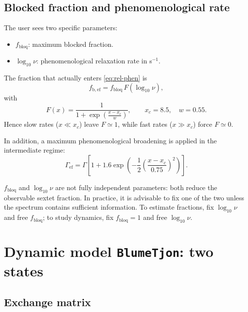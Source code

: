 \documentclass[11pt,a4paper]{article}
\newcommand{\code}[1]{\texttt{\small #1}}
\begin{document}
\subsection{Blocked fraction and phenomenological rate}

The user sees two specific parameters:
\begin{itemize}[leftmargin=*]
  \item $f_{\mathrm{bloq}}$: maximum blocked fraction.
  \item $\log_{10}\nu$: phenomenological relaxation rate in s$^{-1}$.
\end{itemize}
The fraction that actually enters \eqref{eq:rel-phen} is
\begin{equation}
  f_{\mathrm{b,ef}}=f_{\mathrm{bloq}}\,F(\log_{10}\nu),
  \label{eq:fb-eff}
\end{equation}
with
\begin{equation}
  F(x)=\frac{1}{1+\exp\left(\frac{x-x_c}{w}\right)},
  \qquad x_c=8.5,\quad w=0.55.
\end{equation}
Hence slow rates ($x\ll x_c$) leave $F\simeq 1$, while fast rates ($x\gg x_c$)
force $F\simeq 0$.

In addition, a maximum phenomenological broadening is applied in the
intermediate regime:
\begin{equation}
  \Gamma_{\mathrm{ef}}=\Gamma\left[1+1.6\exp\left(-\frac{1}{2}
  \left(\frac{x-x_c}{0.75}\right)^2\right)\right].
\end{equation}

\begin{aviso}
$f_{\mathrm{bloq}}$ and $\log_{10}\nu$ are not fully independent parameters:
both reduce the observable sextet fraction. In practice, it is advisable to fix
one of the two unless the spectrum contains sufficient information. To estimate
fractions, fix $\log_{10}\nu$ and free $f_{\mathrm{bloq}}$; to study dynamics,
fix $f_{\mathrm{bloq}}=1$ and free $\log_{10}\nu$.
\end{aviso}

\section{Dynamic model \code{BlumeTjon}: two states}

\subsection{Exchange matrix}
\end{document}
